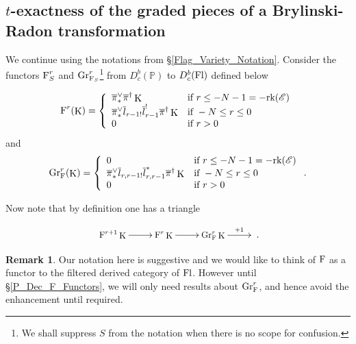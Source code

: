 \documentclass[12pt, reqno]{amsart}
\theoremstyle{plain}
\theoremstyle{definition}
\newtheorem{rem}[thm]{\bf Remark}
\theoremstyle{definition}
\newcommand{\bbP}{{\mathbb P}}
\newcommand{\sE}{{\mathscr E}}
\DeclareMathOperator{\KK}{K}
\begin{document}
\subsection{$t$-exactness of the graded pieces of a Brylinski-Radon transformation}


We continue using the notations from \S \ref{Flag_Variety_Notation}. Consider the functors $\textup{F}_{S}^{r}$ and $\textup{Gr}^{r}_{\textup{F}_S}$\footnote{We shall suppress $S$ from the notation when there is no scope for confusion.}  from $D^{b}_c(\bbP)$  to $D^b_c(\textup{Fl})$ defined below
   

   \begin{center}
   \begin{equation}\label{filt_defn}
       \textup{F}^{r}(\KK)=\left \{
	\begin{array}{ll}
		\overline{\pi}^{\vee}_{*}\overline{\pi}^{\dagger}\KK   & \mbox{if } r \leq -N-1=-\textup{rk}(\sE) \\
		\overline{\pi}^{\vee}_{*}\overline{l}_{r-1!}\overline{l}_{r-1}^!\overline{\pi}^{\dagger}\KK & \mbox{if } -N \leq r \leq 0 \\
        0 & \mbox{if } r>0 \\
	\end{array}
\right.
\end{equation}
\noindent and
\begin{equation}\label{grad_defn}
       \textup{Gr}^{r}_{\textup{F}}(\KK)=\left \{
	\begin{array}{ll}
		0  & \mbox{if } r \leq -N-1=-\textup{rk}(\sE) \\
		\overline{\pi}^{\vee}_{*}\overline{l}_{r,r-1!}\overline{l}_{r,r-1}^{*}\overline{\pi}^{\dagger}\KK & \mbox{if } -N \leq r \leq 0 \\
        0 & \mbox{if } r>0 \\
	\end{array}
\right..
\end{equation}

\end{center}

Now note that by definition one has a triangle

\begin{equation}\label{basic_Gr_triangle}
\small \xymatrix{\textup{F}^{r+1}\KK\ar[r] & \textup{F}^{r}\KK\ar[r] & \textup{Gr}^{r}_{\textup{F}}\KK \ar^-{+1}[r]&}.
\end{equation}
 

\begin{rem}\label{Nota_Sugge}
    Our notation here is suggestive and we would like to think of $\textup{F}$ as a functor to the filtered derived category of $\textup{Fl}$. However until \S \ref{P_Dec_F_Functors}, we will only need results about $\textup{Gr}^{r}_{\textup{F}}$, and hence avoid the enhancement until required.
\end{rem}
\end{document}
